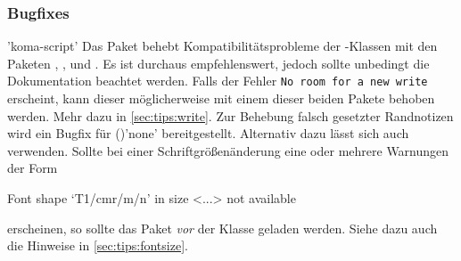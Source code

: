 \subsubsection{Bugfixes}

\begin{DeclarePackages}
'koma-script'
  Das Paket behebt Kompatibilitätsprobleme der \KOMAScript-Klassen mit den 
  Paketen , ,  und
  . Es ist durchaus empfehlenswert, jedoch sollte unbedingt 
  die Dokumentation beachtet werden.
  Falls der Fehler \texttt{No room for a new \bsc write} erscheint, 
  kann dieser möglicherweise mit einem dieser beiden Pakete behoben werden. 
  Mehr dazu in \autoref{sec:tips:write}.
  Zur Behebung falsch gesetzter Randnotizen wird ein Bugfix für 
  ()'none' bereitgestellt. Alternativ 
  dazu lässt sich auch  verwenden.
  Sollte bei einer Schriftgrößenänderung eine oder mehrere Warnungen der Form
  \begin{Code}
    Font shape `T1/cmr/m/n' in size <...> not available
  \end{Code}\vspace{-\baselineskip}%
  erscheinen, so sollte das Paket  \emph{vor} der Klasse 
  geladen werden. Siehe dazu auch die Hinweise in \autoref{sec:tips:fontsize}.%
\end{DeclarePackages}
%

